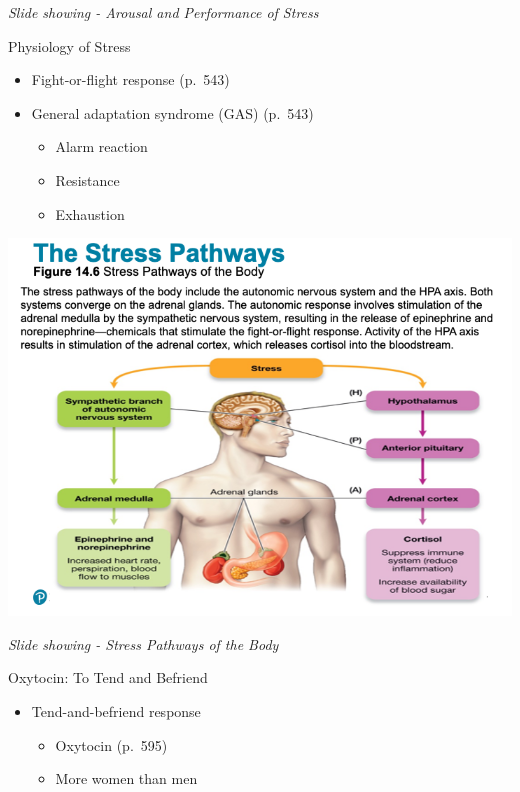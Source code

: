 \documentclass[
]{book}
\providecommand{\tightlist}{%
  \setlength{\itemsep}{0pt}\setlength{\parskip}{0pt}}
\begin{document}
\begin{reflect}
\emph{Slide showing - Arousal and Performance of Stress}

Physiology of Stress

\begin{itemize}
\tightlist
\item
  Fight-or-flight response (p.~543)\\
\item
  General adaptation syndrome (GAS) (p.~543)

  \begin{itemize}
  \tightlist
  \item
    Alarm reaction\\
  \item
    Resistance\\
  \item
    Exhaustion
  \end{itemize}
\end{itemize}

\includegraphics{assets/unit_8/slide_27.png}

\emph{Slide showing - Stress Pathways of the Body}

Oxytocin: To Tend and Befriend

\begin{itemize}
\tightlist
\item
  Tend-and-befriend response

  \begin{itemize}
  \tightlist
  \item
    Oxytocin (p.~595)\\
  \item
    More women than men
  \end{itemize}
\end{itemize}


\end{reflect}
\end{document}
